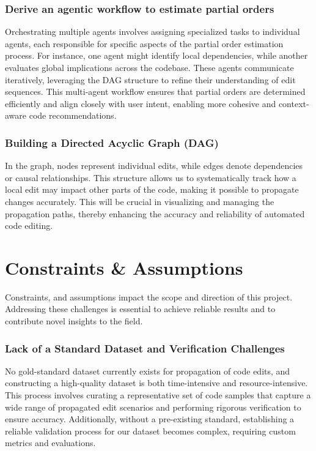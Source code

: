 \subsubsection{Derive an agentic workflow to estimate partial orders}

Orchestrating multiple agents involves assigning specialized tasks to individual agents, each responsible for specific aspects of the partial order estimation process. For instance, one agent might identify local dependencies, while another evaluates global implications across the codebase. These agents communicate iteratively, leveraging the DAG structure to refine their understanding of edit sequences. This multi-agent workflow ensures that partial orders are determined efficiently and align closely with user intent, enabling more cohesive and context-aware code recommendations.


\subsubsection{Building a Directed Acyclic Graph (DAG)}

In the graph, nodes represent individual edits, while edges denote dependencies or causal relationships. This structure allows us to systematically track how a local edit may impact other parts of the code, making it possible to propagate changes accurately. This will be crucial in visualizing and managing the propagation paths, thereby enhancing the accuracy and reliability of automated code editing.

\section{Constraints \& Assumptions}

Constraints, and assumptions impact the scope and direction of this project. Addressing these challenges is essential to achieve reliable results and to contribute novel insights to the field.

\subsubsection{Lack of a Standard Dataset and Verification Challenges}

No gold-standard dataset currently exists for propagation of code edits, and constructing a high-quality dataset is both time-intensive and resource-intensive. This process involves curating a representative set of code samples that capture a wide range of propagated edit scenarios and performing rigorous verification to ensure accuracy. Additionally, without a pre-existing standard, establishing a reliable validation process for our dataset becomes complex, requiring custom metrics and evaluations.

